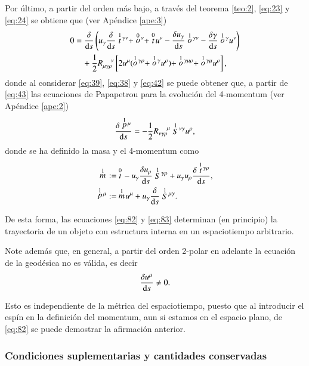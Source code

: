 Por último, a partir del orden más bajo, a través del teorema \ref{teo:2}, \eqref{eq:23} y \eqref{eq:24} se obtiene que (ver Apéndice \ref{ape:3})
\begin{align}
\label{eq:43}
0 &= \cd{} \left( u_{\gamma} \cd{} \des{1}{t}^{\gamma \nu} + \des{0}{o}^{\nu} + \des{0}{t} u^{\nu} - \cd{u_{\gamma}} \des{1}{o}^{\gamma \nu} - \cd{\gamma} \des{1}{o}^{\gamma}u^{\nu} \right) \nonumber \\
& \quad + \frac{1}{2} R^{\ \ \ \ \nu}_{\mu \gamma \rho} \left[ 2u^{\mu}(\des{1}{o}^{\gamma \rho} + \des{1}{o}^{\gamma} u^{\rho}) + \des{1}{o}^{\gamma \mu \rho} + \des{1}{o}^{\gamma \mu}  u^{\rho}  \right],
\end{align}
donde al considerar \eqref{eq:39}, \eqref{eq:38} y \eqref{eq:42} se puede obtener que, a partir de \eqref{eq:43} las ecuaciones de Papapetrou para la evolución del 4-momentum (ver Apéndice \ref{ape:2})
\begin{equation}
\label{eq:82}
\frac{\delta \stackrel{1}{p}{\!}^{\mu}}{\mathrm{d}s} = -\frac{1}{2} R^{\ \ \ \ \mu}_{\nu \gamma \rho} \stackrel{1}{S}{\!}^{\nu \gamma} u^{\rho},
\end{equation}
donde se ha definido la masa y el 4-momentum como
\begin{align}
\stackrel{1}{m}{\!} &:=\ \stackrel{0}{t}{\!} - u_{\gamma} \frac{\delta u_{\rho}}{\mathrm{d}s} \stackrel{1}{S}{\!}^{\gamma \rho} + u_{\gamma} u_{\rho} \frac{\delta \stackrel{1}{t}{\!}^{\gamma \rho}}{\mathrm{d}s},\\
\label{eq:44}
\stackrel{1}{p}{\!}^{\mu} &:=\ \stackrel{1}{m}{\!} u^{\mu} + u_{\gamma} \frac{\delta }{\mathrm{d}s} \stackrel{1}{S}{\!}^{\mu \gamma}.
\end{align}

De esta forma, las ecuaciones \eqref{eq:82} y \eqref{eq:83} determinan (en principio) la trayectoria de un objeto con estructura interna en un espaciotiempo arbitrario.

Note además que, en general, a partir del orden 2-polar en adelante la ecuación de la geodésica no es válida, es decir
\begin{equation}
\frac{\delta u^{\mu}}{\mathrm{d}s} \neq 0.
\end{equation}

Esto es independiente de la métrica del espaciotiempo, puesto que al introducir el espín en la definición del momentum, aun si estamos en el espacio plano, de \eqref{eq:82} se puede demostrar la afirmación anterior.

\subsubsection{Condiciones suplementarias y cantidades conservadas}

